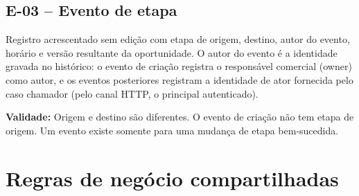 \documentclass[10pt,a4paper]{article}
\begin{document}
\subsection{E-03 -- Evento de etapa}

Registro acrescentado sem edição com etapa de origem, destino, autor do evento, horário e versão resultante da oportunidade. O autor do evento é a identidade gravada no histórico: o evento de criação registra o responsável comercial (owner) como autor, e os eventos posteriores registram a identidade de ator fornecida pelo caso chamador (pelo canal HTTP, o principal autenticado).

\textbf{Validade:} Origem e destino são diferentes. O evento de criação não tem etapa de origem. Um evento existe somente para uma mudança de etapa bem-sucedida.

\section{Regras de negócio compartilhadas}
\end{document}

